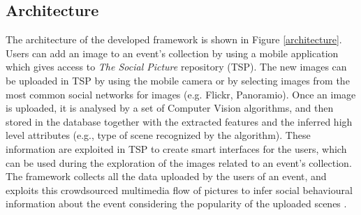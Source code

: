 \subsection{Architecture}
The architecture of the developed framework is shown in Figure \ref{architecture}.
Users can add an image to an event's collection by using a mobile application which gives access to \textit{The Social Picture} repository (TSP). The new images can be uploaded in TSP by using the mobile camera or by selecting images from the most common social networks for images (e.g. Flickr, Panoramio).
Once an image is uploaded, it is analysed by a set of Computer Vision algorithms, and then stored in the database together with the extracted features and the inferred high level attributes (e.g., type of scene recognized by the algorithm). These information are exploited in TSP to create smart interfaces for the users, which can be used during the exploration of the images related to an event's collection.
The framework collects all the data uploaded by the users of an event, and exploits this crowdsourced multimedia flow of pictures to infer social behavioural information about the event considering the popularity of the uploaded scenes \cite{Ortis2015n525}.

